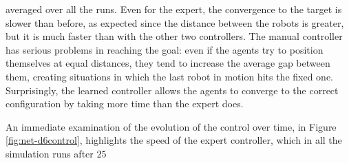 \noindent
averaged over all the runs.
Even for the expert, the convergence to the target is slower than before, 
as expected since the distance between the robots is greater, but it is much faster 
than with the other two controllers.
The manual controller has serious problems in reaching the goal: even if the 
agents try to position themselves at equal distances, they tend to increase the 
average gap between them, creating situations in which the last robot in motion 
hits the fixed one. 
Surprisingly, the learned controller allows the agents to converge to the correct 
configuration by taking more time than the expert does.

An immediate examination of the evolution of the control over time, in Figure 
\ref{fig:net-d6control}, highlights the speed of the expert controller, which in all 
the simulation runs after $25$ 
